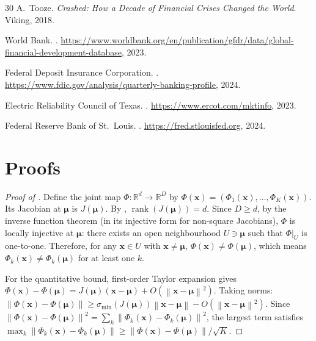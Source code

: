 \documentclass{article}
\newcommand{\R}{\mathbb{R}}
\newcommand{\norm}[1]{\left\lVert#1\right\rVert}
\DeclareMathOperator{\rank}{rank}
\begin{document}
\begin{thebibliography}{30}
A.~Tooze.
\newblock \emph{Crashed: How a Decade of Financial Crises Changed the World}.
\newblock Viking, 2018.

{World Bank}.
.
\newblock \url{https://www.worldbank.org/en/publication/gfdr/data/global-financial-development-database}, 2023.

{Federal Deposit Insurance Corporation}.
.
\newblock \url{https://www.fdic.gov/analysis/quarterly-banking-profile}, 2024.

{Electric Reliability Council of Texas}.
.
\newblock \url{https://www.ercot.com/mktinfo}, 2023.

{Federal Reserve Bank of St.\ Louis}.
.
\newblock \url{https://fred.stlouisfed.org}, 2024.

\end{thebibliography}

\newpage
\appendix

\section{Proofs}
\label{app:proofs}

\begin{proof}[Proof of ]
Define the joint map $\Phi: \R^d \to \R^D$ by $\Phi(\mathbf{x}) = (\Phi_1(\mathbf{x}), \ldots, \Phi_K(\mathbf{x}))$. Its Jacobian at $\bm{\mu}$ is $J(\bm{\mu})$. By , $\rank(J(\bm{\mu})) = d$. Since $D \geq d$, by the inverse function theorem (in its injective form for non-square Jacobians), $\Phi$ is locally injective at $\bm{\mu}$: there exists an open neighbourhood $U \ni \bm{\mu}$ such that $\Phi|_U$ is one-to-one. Therefore, for any $\mathbf{x} \in U$ with $\mathbf{x} \neq \bm{\mu}$, $\Phi(\mathbf{x}) \neq \Phi(\bm{\mu})$, which means $\Phi_k(\mathbf{x}) \neq \Phi_k(\bm{\mu})$ for at least one $k$.

For the quantitative bound, first-order Taylor expansion gives $\Phi(\mathbf{x}) - \Phi(\bm{\mu}) = J(\bm{\mu})(\mathbf{x} - \bm{\mu}) + O(\norm{\mathbf{x}-\bm{\mu}}^2)$. Taking norms: $\norm{\Phi(\mathbf{x}) - \Phi(\bm{\mu})} \geq \sigma_{\min}(J(\bm{\mu})) \norm{\mathbf{x} - \bm{\mu}} - O(\norm{\mathbf{x}-\bm{\mu}}^2)$. Since $\norm{\Phi(\mathbf{x}) - \Phi(\bm{\mu})}^2 = \sum_k \norm{\Phi_k(\mathbf{x}) - \Phi_k(\bm{\mu})}^2$, the largest term satisfies $\max_k \norm{\Phi_k(\mathbf{x}) - \Phi_k(\bm{\mu})} \geq \norm{\Phi(\mathbf{x}) - \Phi(\bm{\mu})}/\sqrt{K}$.
\end{proof}
\end{document}
